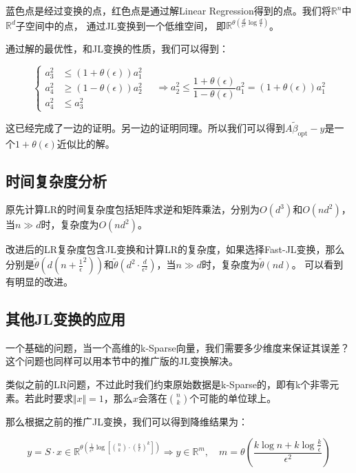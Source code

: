 \documentclass[lang=cn,newtx,10pt,scheme=chinese,chinesefont=nofont,citestyle=gb7714-2015, bibstyle=gb7714-2015]{elegantbook}
\begin{document}
\begin{refsection}
\begin{center}
\begin{tikzpicture}[scale=1.5]
    \end{tikzpicture}
\end{center}
\begin{remark}
    蓝色点是经过变换的点，红色点是通过解Linear Regression得到的点。我们将$\mathbb{R}^n$中$\mathbb{R}^d$子空间中的点，
    通过JL变换到一个低维空间，
    即$\mathbb{R}^{\theta(\frac{d}{\epsilon^2}\log \frac{d}{\epsilon})}$。
\end{remark}

通过解的最优性，和JL变换的性质，我们可以得到：

$$
\left\{
\begin{aligned}
a_3^2 &\le (1+\theta(\epsilon))a_1^2 \\
a_4^2 &\ge (1-\theta(\epsilon))a_2^2\\
a_4^2 &\le a_3^2
\end{aligned}
\right.
\quad\Longrightarrow a_2^2 \le \frac{1+\theta(\epsilon)}{1-\theta(\epsilon)}a_1^2 = (1+\theta(\epsilon))a_1^2
$$

这已经完成了一边的证明。另一边的证明同理。所以我们可以得到$A\widetilde{\beta}_{\text{opt}}-y$是一个$1+\theta(\epsilon)$近似比的解。

\subsection{时间复杂度分析}

原先计算LR的时间复杂度包括矩阵求逆和矩阵乘法，分别为$O(d^3)$和$O(nd^2)$，当$n\gg d$时，复杂度为$O(nd^2)$。

改进后的LR复杂度包含JL变换和计算LR的复杂度，如果选择Fast-JL变换，那么分别是$\widetilde{\theta}(d(n+\frac 1 {\epsilon}^2))$和$\widetilde{\theta}(d^2\cdot \frac d {\epsilon^2})$，当$n\gg d$时，复杂度为$\widetilde{\theta}(nd)$。
可以看到有明显的改进。

\subsection{其他JL变换的应用}

一个基础的问题，当一个高维的k-Sparse向量，我们需要多少维度来保证其误差？这个问题也同样可以用本节中的推广版的JL变换解决。

类似之前的LR问题，不过此时我们约束原始数据是k-Sparse的，即有k个非零元素。若此时要求$\Vert x \Vert = 1$，那么$x$会落在$\binom{n}{k}$个可能的单位球上。

那么根据之前的推广JL变换，我们可以得到降维结果为：

$$
y = S\cdot x \in \mathbb{R}^{\theta(\frac{1}{\epsilon^2}\log \left[\binom{n}{k}\cdot (\frac k \epsilon)^k\right])}
\Longrightarrow y \in \mathbb{R}^m,\quad m = \theta\left(\frac{k\log n + k\log \frac k \epsilon}{\epsilon^2}\right)
$$

\end{refsection}
\end{document}

